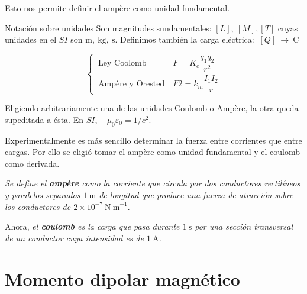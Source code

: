 \vspace{10mm} %

Esto nos permite definir el ampère como unidad fundamental.

\vspace{25mm} %

\begin{myexampleblock}{Notación sobre unidades}
	Son magnitudes sundamentales: $[L],\ [M], [T]$ cuyas unidades en el $SI$ son $\mathrm{m},\ \mathrm{kg},\ \mathrm{s}$.
	Definimos también la carga eléctrica: $\ [Q] \ \to \ \mathrm{C}$
	
 	$$\begin{cases}
\ \text{Ley Coolomb} \quad & 	\ F=K_e \dfrac{q_1q_2}{r^2}\\
\ \text{Ampère y Orested} & \ F2=k_m \dfrac{I_1 I_2}{r} 
\end{cases}
 $$
 
\vspace{2mm} Eligiendo arbitrariamente una de las unidades Coulomb o Ampère, la otra queda supeditada a ésta. En $SI,\quad \mu_0\varepsilon_0=1/c^2$.
 
\vspace{2mm} Experimentalmente es más sencillo determinar la fuerza entre corrientes que entre cargas. Por ello se eligió tomar el ampère como unidad fundamental y el coulomb como derivada.
 
\vspace{2mm} \emph{Se define el \textbf{ampère} como la corriente que circula por dos conductores rectilíneos y paralelos separados $1\ \mathrm{m}$ de longitud que produce una fuerza de atracción sobre los conductores de $2\times 10^{-7} \ \mathrm{N\ m}^{-1}$}.
 
\vspace{2mm} Ahora, \emph{el \textbf{coulomb} es la carga que pasa durante $1\ \mathrm{s}$ por una sección transversal de un conductor cuya intensidad es de $1\ \mathrm{A}$.}
\end{myexampleblock} 

\newpage %

\section{Momento dipolar magnético}

